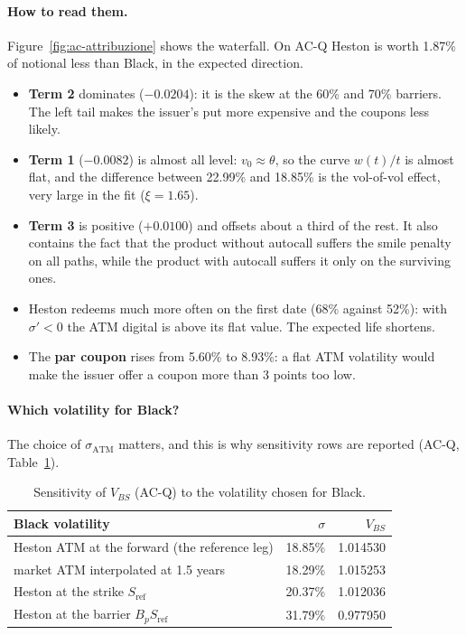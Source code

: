 \paragraph{How to read them.} Figure~\ref{fig:ac-attribuzione} shows the waterfall. On \mbox{AC-Q} Heston is worth
1.87\% of notional less than Black, in the expected direction.
\begin{itemize}
\item \textbf{Term 2} dominates ($-0.0204$): it is the skew at the 60\% and 70\% barriers. The left tail makes the
issuer's put more expensive and the coupons less likely.
\item \textbf{Term 1} ($-0.0082$) is almost all level: $v_0\approx\theta$, so the curve $w(t)/t$ is almost flat, and
the difference between 22.99\% and 18.85\% is the vol-of-vol effect, very large in the fit ($\xi=1.65$).
\item \textbf{Term 3} is positive ($+0.0100$) and offsets about a third of the rest. It also contains the fact that the
product without autocall suffers the smile penalty on all paths, while the product with autocall suffers it only on
the surviving ones.
\item Heston redeems much more often on the first date (68\% against 52\%): with $\sigma'<0$ the ATM digital is above
its flat value. The expected life shortens.
\item The \textbf{par coupon} rises from 5.60\% to 8.93\%: a flat ATM volatility would make the issuer offer a coupon
more than 3 points too low.
\end{itemize}

\paragraph{Which volatility for Black?} The choice of $\sigma_{\mathrm{ATM}}$ matters, and this is why sensitivity rows
are reported (\mbox{AC-Q}, Table~\ref{tab:ac-sens}).
\begin{table}[htbp]
\centering
\small
\caption{Sensitivity of $V_{BS}$ (\mbox{AC-Q}) to the volatility chosen for Black.}
\label{tab:ac-sens}
\begin{tabularx}{\textwidth}{Xrr}
\toprule
Black volatility & $\sigma$ & $V_{BS}$\\
\midrule
Heston ATM at the forward (the reference leg) & 18.85\% & 1.014530\\
market ATM interpolated at 1.5 years & 18.29\% & 1.015253\\
Heston at the strike $S_{\text{ref}}$ & 20.37\% & 1.012036\\
Heston at the barrier $B_pS_{\text{ref}}$ & 31.79\% & 0.977950\\
\bottomrule
\end{tabularx}
\end{table}

